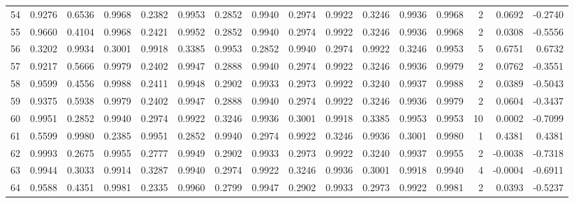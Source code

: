 \begin{tabular}{lrrrrrrrrrrrrrrr}
54  &      0.9276 &  0.6536 &  0.9968 &  0.2382 &  0.9953 &  0.2852 &  0.9940 &  0.2974 &  0.9922 &  0.3246 &   0.9936 &     0.9968 &      2 &                    0.0692 &                    -0.2740 \\
55  &      0.9660 &  0.4104 &  0.9968 &  0.2421 &  0.9952 &  0.2852 &  0.9940 &  0.2974 &  0.9922 &  0.3246 &   0.9936 &     0.9968 &      2 &                    0.0308 &                    -0.5556 \\
56  &      0.3202 &  0.9934 &  0.3001 &  0.9918 &  0.3385 &  0.9953 &  0.2852 &  0.9940 &  0.2974 &  0.9922 &   0.3246 &     0.9953 &      5 &                    0.6751 &                     0.6732 \\
57  &      0.9217 &  0.5666 &  0.9979 &  0.2402 &  0.9947 &  0.2888 &  0.9940 &  0.2974 &  0.9922 &  0.3246 &   0.9936 &     0.9979 &      2 &                    0.0762 &                    -0.3551 \\
58  &      0.9599 &  0.4556 &  0.9988 &  0.2411 &  0.9948 &  0.2902 &  0.9933 &  0.2973 &  0.9922 &  0.3240 &   0.9937 &     0.9988 &      2 &                    0.0389 &                    -0.5043 \\
59  &      0.9375 &  0.5938 &  0.9979 &  0.2402 &  0.9947 &  0.2888 &  0.9940 &  0.2974 &  0.9922 &  0.3246 &   0.9936 &     0.9979 &      2 &                    0.0604 &                    -0.3437 \\
60  &      0.9951 &  0.2852 &  0.9940 &  0.2974 &  0.9922 &  0.3246 &  0.9936 &  0.3001 &  0.9918 &  0.3385 &   0.9953 &     0.9953 &     10 &                    0.0002 &                    -0.7099 \\
61  &      0.5599 &  0.9980 &  0.2385 &  0.9951 &  0.2852 &  0.9940 &  0.2974 &  0.9922 &  0.3246 &  0.9936 &   0.3001 &     0.9980 &      1 &                    0.4381 &                     0.4381 \\
62  &      0.9993 &  0.2675 &  0.9955 &  0.2777 &  0.9949 &  0.2902 &  0.9933 &  0.2973 &  0.9922 &  0.3240 &   0.9937 &     0.9955 &      2 &                   -0.0038 &                    -0.7318 \\
63  &      0.9944 &  0.3033 &  0.9914 &  0.3287 &  0.9940 &  0.2974 &  0.9922 &  0.3246 &  0.9936 &  0.3001 &   0.9918 &     0.9940 &      4 &                   -0.0004 &                    -0.6911 \\
64  &      0.9588 &  0.4351 &  0.9981 &  0.2335 &  0.9960 &  0.2799 &  0.9947 &  0.2902 &  0.9933 &  0.2973 &   0.9922 &     0.9981 &      2 &                    0.0393 &                    -0.5237 \\

\end{tabular}
